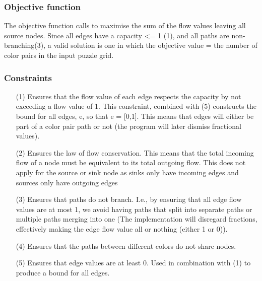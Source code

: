 \documentclass{homeworg}
\begin{document}
\newpage
\subsubsection{Objective function}
The objective function calls to maximise the sum of the flow values leaving all source nodes. Since all edges have a capacity <= 1 (1), and all paths are non-branching(3), a valid solution is one in which the objective value = the number of color pairs in the input puzzle grid. 

\subsubsection{Constraints}
\begin{enumerate}
    \item[(1)] Ensures that the flow value of each edge respects the capacity by not exceeding a flow value of 1. This constraint, combined with (5) constructs the bound for all edges, e, so that e = [0,1]. This means that edges will either be part of a color pair path or not (the program will later dismiss fractional values).
    \item[(2)] Ensures the law of flow conservation. This means that the total incoming flow of a node must be equivalent to its total outgoing flow. This does not apply for the source or sink node as sinks only have incoming edges and sources only have outgoing edges
    \item[(3)] Ensures that paths do not branch. I.e., by ensuring that all edge flow values are at most 1, we avoid having paths that split into separate paths or multiple paths merging into one (The implementation will disregard fractions, effectively making the edge flow value all or nothing (either 1 or 0)).
    \item[(4)] Ensures that the paths between different colors do not share nodes.
    \item[(5)] Ensures that edge values are at least 0. Used in combination with (1) to produce a bound for all edges.
\end{enumerate}
\end{document}
